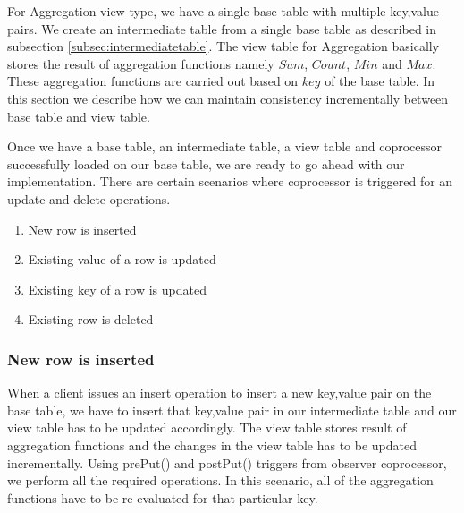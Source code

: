 \documentclass[11pt,a4paper,bibtotoc,idxtotoc,headsepline,footsepline,footexclude,BCOR12mm,DIV13]{scrbook}
\begin{document}
For Aggregation view type, we have a single base table with multiple key,value pairs. We create an intermediate table from a single base table as described in subsection \ref{subsec:intermediatetable}. The view table for Aggregation basically stores the result of aggregation functions namely $Sum$, $Count$, $Min$ and $Max$. These aggregation functions are carried out based on $key$ of the base table. In this section we describe how we can maintain consistency incrementally between base table and view table. 



    

Once we have a base table, an intermediate table, a view table and coprocessor successfully loaded on our base table, we are ready to go ahead with our implementation. There are certain scenarios where coprocessor is triggered for an update and delete operations.

\begin{enumerate}
    \item New row is inserted
    \item Existing value of a row is updated
    \item Existing key of a row is updated
    \item Existing row is deleted
\end{enumerate}

\subsubsection{New row is inserted}
\label{Aggr: New Row Inserted}
When a client issues an insert operation to insert a new key,value pair on the base table, we have to insert that key,value pair in our intermediate table and our view table has to be updated accordingly. The view table stores result of aggregation functions and the changes in the view table has to be updated incrementally. Using prePut() and postPut() triggers from observer coprocessor, we perform all the required operations. In this scenario, all of the aggregation functions have to be re-evaluated for that particular key.
\end{document}
